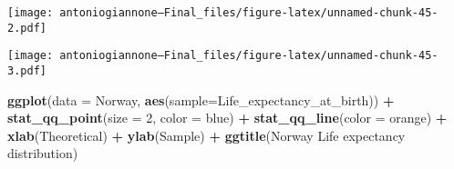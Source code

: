 \documentclass[
]{article}
\newenvironment{Shaded}{\begin{snugshade}}{\end{snugshade}}
\newcommand{\AttributeTok}[1]{\textcolor[rgb]{0.13,0.29,0.53}{#1}}
\newcommand{\CommentTok}[1]{\textcolor[rgb]{0.56,0.35,0.01}{\textit{#1}}}
\newcommand{\DecValTok}[1]{\textcolor[rgb]{0.00,0.00,0.81}{#1}}
\newcommand{\FunctionTok}[1]{\textcolor[rgb]{0.13,0.29,0.53}{\textbf{#1}}}
\newcommand{\NormalTok}[1]{#1}
\newcommand{\SpecialCharTok}[1]{\textcolor[rgb]{0.81,0.36,0.00}{\textbf{#1}}}
\newcommand{\StringTok}[1]{\textcolor[rgb]{0.31,0.60,0.02}{#1}}
\begin{document}
\texttt{[image: antoniogiannone---Final\_files/figure-latex/unnamed-chunk-45-2.pdf]}

\begin{Shaded}
\end{Shaded}

\texttt{[image: antoniogiannone---Final\_files/figure-latex/unnamed-chunk-45-3.pdf]}

\begin{Shaded}
\begin{Highlighting}[]
\FunctionTok{ggplot}\NormalTok{(}\AttributeTok{data =}\NormalTok{ Norway, }\FunctionTok{aes}\NormalTok{(}\AttributeTok{sample=}\NormalTok{Life\_expectancy\_at\_birth)) }\SpecialCharTok{+}
  \FunctionTok{stat\_qq\_point}\NormalTok{(}\AttributeTok{size =} \DecValTok{2}\NormalTok{, }\AttributeTok{color =} \StringTok{\textquotesingle{}blue\textquotesingle{}}\NormalTok{) }\SpecialCharTok{+}
  \FunctionTok{stat\_qq\_line}\NormalTok{(}\AttributeTok{color =} \StringTok{\textquotesingle{}orange\textquotesingle{}}\NormalTok{) }\SpecialCharTok{+}
  \FunctionTok{xlab}\NormalTok{(}\StringTok{\textquotesingle{}Theoretical\textquotesingle{}}\NormalTok{) }\SpecialCharTok{+}
  \FunctionTok{ylab}\NormalTok{(}\StringTok{\textquotesingle{}Sample\textquotesingle{}}\NormalTok{) }\SpecialCharTok{+}
  \FunctionTok{ggtitle}\NormalTok{(}\StringTok{\textquotesingle{}Norway Life expectancy distribution\textquotesingle{}}\NormalTok{)}
\end{Highlighting}
\end{Shaded}
\end{document}
